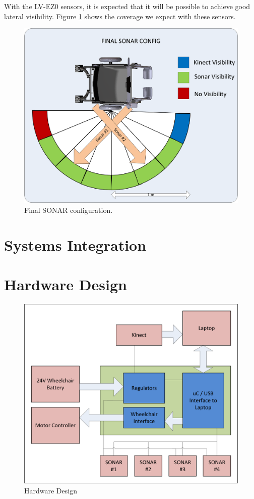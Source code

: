 \documentclass[oneside,final,a4paper]{report}
\begin{document}
With the LV-EZ0 sensors, it is expected that it will be possible to achieve good lateral visibility. Figure \ref{sonar_final} shows the coverage we expect with these sensors.

\begin{figure}[hbt]
 \centering
 \includegraphics[scale=0.6]{SONAR_Config_Final.png}
 \caption{Final SONAR configuration.}
 \label{sonar_final}
\end{figure}


\section{Systems Integration}

\section{Hardware Design}
\begin{figure}[hbt]
 \centering
 \includegraphics[scale=0.9]{Hardware_Diagram}
 \caption{Hardware Design}\label{fig:hardware}
\end{figure}
\end{document}
